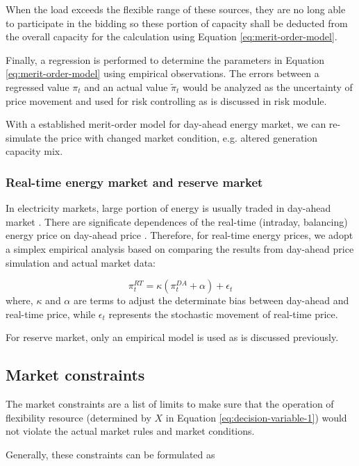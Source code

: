 When the load exceeds the flexible range of these sources, they are no long able to participate in the bidding so these portion of capacity shall be deducted from the overall capacity for the calculation using Equation \eqref{eq:merit-order-model}.

Finally, a regression is performed to determine the parameters in Equation \eqref{eq:merit-order-model} using empirical observations. The errors between a regressed value $\pi_t$ and an actual value $\tilde{\pi}_t$ would be analyzed as the uncertainty of price movement and used for risk controlling as is discussed in risk module. 

With a established merit-order model for day-ahead energy market, we can re-simulate the price with changed market condition, e.g. altered generation capacity mix.

\subsubsection{Real-time energy market and reserve market}

In electricity markets, large portion of energy is usually traded in day-ahead market \cite{Kardakos2013}. There are significate dependences of the real-time (intraday, balancing) energy price on day-ahead price \cite{Woo2016}. Therefore, for real-time energy prices, we adopt a simplex empirical analysis based on comparing the results from day-ahead price simulation and actual market data:

\begin{equation}
\pi^{RT}_t = \kappa (\pi^{DA}_t + \alpha) + \epsilon_t
\end{equation}
where, $\kappa$ and $\alpha$ are terms to adjust the determinate bias between day-ahead and real-time price, while $\epsilon_t$ represents the stochastic movement of real-time price. 

For reserve market, only an empirical model is used as is discussed previously.

\subsection{Market constraints}

The market constraints are a list of limits to make sure that the operation of flexibility resource (determined by $X$ in Equation \eqref{eq:decision-variable-1}) would not violate the actual market rules and market conditions.

Generally, these constraints can be formulated as

